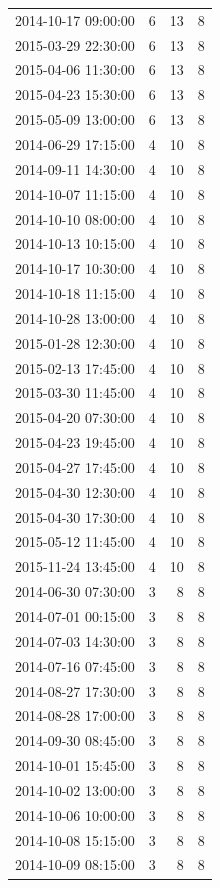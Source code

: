 \begin{tabular}{lrrr}
2014-10-17 09:00:00 & 6 & 13 & 8 \\
2015-03-29 22:30:00 & 6 & 13 & 8 \\
2015-04-06 11:30:00 & 6 & 13 & 8 \\
2015-04-23 15:30:00 & 6 & 13 & 8 \\
2015-05-09 13:00:00 & 6 & 13 & 8 \\
2014-06-29 17:15:00 & 4 & 10 & 8 \\
2014-09-11 14:30:00 & 4 & 10 & 8 \\
2014-10-07 11:15:00 & 4 & 10 & 8 \\
2014-10-10 08:00:00 & 4 & 10 & 8 \\
2014-10-13 10:15:00 & 4 & 10 & 8 \\
2014-10-17 10:30:00 & 4 & 10 & 8 \\
2014-10-18 11:15:00 & 4 & 10 & 8 \\
2014-10-28 13:00:00 & 4 & 10 & 8 \\
2015-01-28 12:30:00 & 4 & 10 & 8 \\
2015-02-13 17:45:00 & 4 & 10 & 8 \\
2015-03-30 11:45:00 & 4 & 10 & 8 \\
2015-04-20 07:30:00 & 4 & 10 & 8 \\
2015-04-23 19:45:00 & 4 & 10 & 8 \\
2015-04-27 17:45:00 & 4 & 10 & 8 \\
2015-04-30 12:30:00 & 4 & 10 & 8 \\
2015-04-30 17:30:00 & 4 & 10 & 8 \\
2015-05-12 11:45:00 & 4 & 10 & 8 \\
2015-11-24 13:45:00 & 4 & 10 & 8 \\
2014-06-30 07:30:00 & 3 & 8 & 8 \\
2014-07-01 00:15:00 & 3 & 8 & 8 \\
2014-07-03 14:30:00 & 3 & 8 & 8 \\
2014-07-16 07:45:00 & 3 & 8 & 8 \\
2014-08-27 17:30:00 & 3 & 8 & 8 \\
2014-08-28 17:00:00 & 3 & 8 & 8 \\
2014-09-30 08:45:00 & 3 & 8 & 8 \\
2014-10-01 15:45:00 & 3 & 8 & 8 \\
2014-10-02 13:00:00 & 3 & 8 & 8 \\
2014-10-06 10:00:00 & 3 & 8 & 8 \\
2014-10-08 15:15:00 & 3 & 8 & 8 \\
2014-10-09 08:15:00 & 3 & 8 & 8 \\

\end{tabular}
